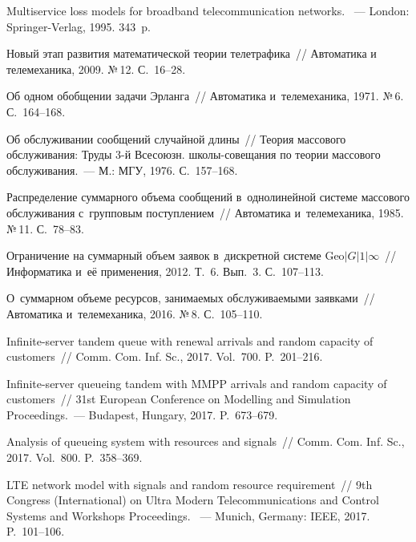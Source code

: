 \begin{multicols}{2}
{{\begin{thebibliography}{99}
{Multiservice loss models for broadband telecommunication networks}. ~--- {London: 
Springer-Verlag}, 1995. 343~p.

Новый этап развития математической теории телетрафика~// 
Автоматика и телемеханика, 2009.  №\,12. С.~16--28.

 

Об одном обобщении задачи Эрланга~// {Автоматика и~телемеханика}, 1971. №\,6. 
С.~164--168.

Об обслуживании сообщений случайной длины~// {Теория массового обслуживания: 
Труды 3-й Всесоюзн. шко\-лы-со\-ве\-ща\-ния по тео\-рии массового обслуживания}.~--- М.: 
МГУ, 1976. С.~157--168.

Распределение суммарного объема сообщений в~однолинейной сис\-те\-ме массового 
обслуживания с~групповым поступлением~// {Автоматика и~телемеханика}, 1985. 
№\,11. С.~78--83.

Ограничение на суммарный объем заявок в~дискретной сис\-те\-ме $\mathrm{Geo}|G|1|\infty$~// 
{Информатика и~её применения}, 2012. Т.~6. Вып.~3. С.~107--113.

О~суммарном объеме ресурсов, занимаемых обслуживаемыми заявками~// {Автоматика 
и~телемеханика}, 2016. №\,8. С.~105--110.

Infinite-server tandem queue with renewal arrivals and random capacity of 
customers~// {Comm. Com. Inf. Sc.}, 2017. 
Vol.~700. P.~201--216.

Infinite-server queueing tandem with MMPP arrivals and random capacity of 
customers~// {31st European Conference on Modelling and Simulation Proceedings}.~--- 
Budapest, Hungary, 2017. P.~673--679.

Analysis of queueing system with resources and signals~// {Comm. 
Com. Inf. Sc.}, 2017. Vol.~800. P.~358--369.

LTE network model with signals and random resource requirement~// {9th 
 Congress (International) on Ultra Modern Telecommunications and Control Systems 
and Workshops Proceedings}. ~--- Munich, Germany: IEEE, 2017. P.~101--106.




\end{thebibliography}}}
\end{multicols}
